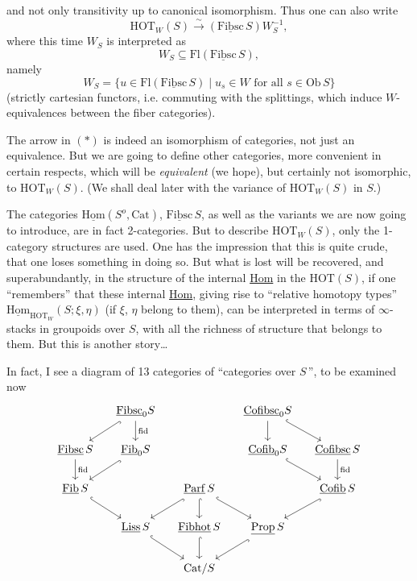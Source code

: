 \documentclass[11pt]{article}
\newcommand{\printedpage}[1]{\marginpar{\footnotesize p.~#1}}
\newcommand{\msp}[1]{\marginpar{\footnotesize [#1]}}
\newcommand{\ul}[1]{\underline{\mathrm{#1}}}
\begin{document}
\printedpage{4}
and not only transitivity up to canonical isomorphism. Thus one can also write
\[
\mathrm{HOT}_W(S) \xrightarrow{\ \sim\ } (\ul{Fibsc}\,S)W_S^{-1}, \tag*{$(*)$}
\]
where this time $W_S$ is interpreted as
\[
W_S \subseteq \mathrm{Fl}(\ul{Fibsc}\,S),
\]
namely
\[
W_S = \{u \in \mathrm{Fl}(\ul{Fibsc}\,S) \mid u_s \in W \text{ for all } s \in \mathrm{Ob}\,S\}
\]
(strictly cartesian functors, i.e. commuting with the splittings, which induce $W$-equivalences between the fiber categories).

The arrow in $(*)$ is indeed an isomorphism of categories, not just an equivalence. But we are going to define other categories, more convenient in certain respects, which will be \textit{equivalent} (we hope), but certainly not isomorphic, to $\mathrm{HOT}_W(S)$. (We shall deal later with the variance of $\mathrm{HOT}_W(S)$ in $S$.)

The categories $\ul{Hom}(S^o,\mathrm{Cat})$, $\ul{Fibsc}\,S$, as well as the variants we are now going to introduce, are in fact 2-categories. But to describe $\mathrm{HOT}_W(S)$, only the 1-category structures are used. One has the impression that this is quite %
\msp{page 5}
crude, that one loses something in doing so. But what is lost will be recovered, and superabundantly, in the structure of the internal \underline{Hom} in the $\mathrm{HOT}(S)$, if one ``remembers'' that these internal \underline{Hom}, giving rise to ``relative homotopy types'' $\ul{Hom}_{\mathrm{HOT}_W}(S;\xi,\eta)$ (if $\xi$, $\eta$ belong to them), can be interpreted in terms of $\infty$-stacks in groupoids over $S$, with all the richness of structure that belongs to them. But this is another story\dots

In fact, I see a diagram of 13 categories of ``categories over $S$\,'', to be examined now %
\[
\begin{tikzcd}[column sep=small]
 & \ul{Fibsc}_0S \arrow[dl, hook] \arrow[d, "\mathrm{fid}"] & & \ul{Cofibsc}_0S \arrow[d] \arrow[dr, hook] & \\
\ul{Fibsc}\,S \arrow[d, "\mathrm{fid}"] & \ul{Fib}_0S \arrow[dl, hook] & & \ul{Cofib}_0S \arrow[dr, hook] & \ul{Cofibsc}\,S \arrow[d, "\mathrm{fid}"] \\
\ul{Fib}\,S \arrow[dr, hook] & & \ul{Parf}\,S \arrow[dl, hook] \arrow[d, hook] \arrow[dr, hook] & & \ul{Cofib}\,S \arrow[dl, hook] \\
 & \ul{Liss}\,S \arrow[dr, hook] & \ul{Fibhot}\,S \arrow[d, hook] & \ul{Prop}\,S \arrow[dl, hook] & \\
 & & \mathrm{Cat}/S & &
\end{tikzcd}
\]
\end{document}
